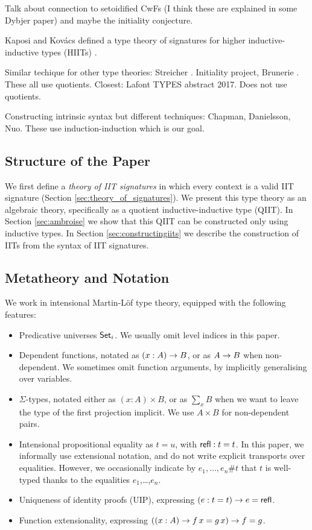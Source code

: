 \documentclass[a4paper,UKenglish,cleveref, autoref]{lipics-v2019}
\begin{document}
Talk about connection to setoidified CwFs (I think these are explained
in some Dybjer paper) and maybe the initiality conjecture.

Kaposi and Kov{\'a}cs defined a type theory of signatures for higher
inductive-inductive types (HIITs)
\cite{kaposi_et_al:LIPIcs:2018:9190}.

Similar techique for other type theories: Streicher
\cite{streichersemantics}. Initiality project, Brunerie \cite{}. These
all use quotients. Closest: Lafont TYPES abstract 2017. Does not use
quotients.

Constructing intrinsic syntax but different techniques: Chapman,
Danielsson, Nuo. These use induction-induction which is our goal.

\subsection{Structure of the Paper}

We first define a \emph{theory of IIT signatures} in which every context is a
valid IIT signature (Section \ref{sec:theory_of_signatures}). We present this
type theory as an algebraic \cite{ttintt} theory, specifically as a quotient
inductive-inductive type (QIIT). In Section \ref{sec:ambroise} we show that this
QIIT can be constructed only using inductive types. In Section
\ref{sec:constructingiits} we describe the construction of IITs from the syntax
of IIT signatures.

\subsection{Metatheory and Notation}

We work in intensional Martin-Löf type theory, equipped with the following features:
\begin{itemize}
  \item Predicative universes $\mathsf{Set}_i$. We usually omit level indices in this paper.
  \item Dependent functions, notated as $(x : A)\rightarrow B$, or as $A \rightarrow B$ when
    non-dependent. We sometimes omit function arguments, by implicitly
    generalising over variables.
  \item $\Sigma$-types, notated either as $(x : A)\times B$, or as $\sum\limits_{x} B$
        when we want to leave the type of the first projection implicit. We use $A
        \times B$ for non-dependent pairs.
  \item Intensional propositional equality as $t = u$, with $\mathsf{refl} : t = t$. In
    this paper, we informally use extensional notation, and do not write
    explicit transports over equalities. However, we occasionally indicate by
    $e_1,\dots,e_n \#t$ that $t$ is well-typed thanks to the equalities
    $e_1$,\dots,$e_n$.
  \item Uniqueness of identity proofs (UIP), expressing $(e : t = t)\rightarrow e = \mathsf{refl}$.
  \item Function extensionality, expressing $((x : A) \rightarrow f\,x = g\,x) \rightarrow f = g$.

\end{itemize}
\end{document}
